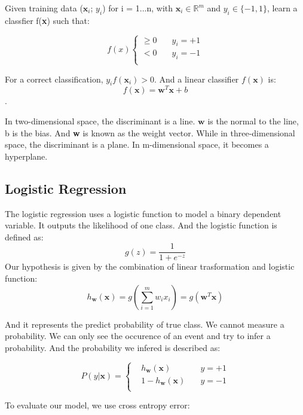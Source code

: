 \documentclass[journal, a4paper]{IEEEtran}
\begin{document}
Given training data ($\textbf{x}_i$; $y_i$) for i = 1...n, with $\textbf{x}_i \in \mathbb{R}^m$ and
$y_i \in \{-1,1\}$, learn a classfier f(\textbf{x}) such that:

$$ f(x)\left\{
\begin{aligned}
\geq 0& \quad    y_i = +1 \\
<0&  \quad y_i = -1 \\
\end{aligned}
\right.
$$

For a correct classification, $y_if(\textbf{x}_i) > 0$. And a linear classifier $f(\textbf{x})$ is:
$$f(\textbf{x})=\textbf{w}^T\textbf{x}+b$$.

In two-dimensional space, the discriminant is a line.
$\textbf{w}$ is the normal to the line, b is the bias. And \textbf{w} is known as the weight vector. While in three-dimensional space, the discriminant is a plane. In m-dimensional space, it becomes a hyperplane.

\subsection{Logistic Regression}

The logistic regression uses a logistic function to model a binary dependent variable. It outputs the likelihood of one class. And the logistic function is defined as: 
\begin{equation}
g(z) = \frac{1}{1+e^{-z}}
\end{equation} 
Our hypothesis is given by the combination of linear trasformation and logistic function:
\begin{equation}
h_\textbf{w}(\textbf{x}) = g(\sum_{i=1}^m w_ix_i) = g(\textbf{w}^T\textbf{x})
\end{equation}

And it represents the predict probability of true class. We cannot measure a probability. We can only see the occurence of an event and try to infer a
probability. And the probability we infered is described as:

\begin{equation}
P(y|\textbf{x}) = 
\left\{
\begin{aligned}
&h_\textbf{w}(\textbf{x}) \quad    &y = +1 \\
&1-h_\textbf{w}(\textbf{x})  \quad &y = -1 \\
\end{aligned}
\right.
\end{equation}

To evaluate our model, we use cross entropy error:
\end{document}
